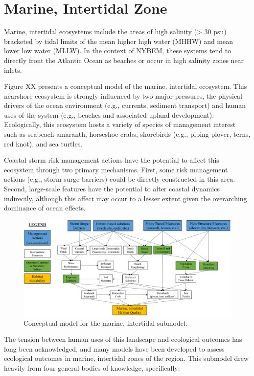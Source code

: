 \documentclass[
]{book}
\begin{document}
\hypertarget{marine-intertidal-zone}{%
\section{Marine, Intertidal Zone}\label{marine-intertidal-zone}}

Marine, intertidal ecosystems include the areas of high salinity (\textgreater{} 30 psu) bracketed by tidal limits of the mean higher high water (MHHW) and mean lower low water (MLLW). In the context of NYBEM, these systems tend to directly front the Atlantic Ocean as beaches or occur in high salinity zones near inlets.

Figure XX presents a conceptual model of the marine, intertidal ecosystem. This nearshore ecosystem is strongly influenced by two major pressures, the physical drivers of the ocean environment (e.g., currents, sediment transport) and human uses of the system (e.g., beaches and associated upland development). Ecologically, this ecosystem hosts a variety of species of management interest such as seabeach amaranth, horseshoe crabs, shorebirds (e.g., piping plover, terns, red knot), and sea turtles.

Coastal storm risk management actions have the potential to affect this ecosystem through two primary mechanisms. First, some risk management actions (e.g., storm surge barriers) could be directly constructed in this area. Second, large-scale features have the potential to alter coastal dynamics indirectly, although this affect may occur to a lesser extent given the overarching dominance of ocean effects.

\begin{figure}
\includegraphics[width=24.99in]{ZZ_Fig04.10_Mar.Int_ConModel} \caption{Conceptual model for the marine, intertidal submodel.}\label{fig:unnamed-chunk-19}
\end{figure}

The tension between human uses of this landscape and ecological outcomes has long been acknowledged, and many models have been developed to assess ecological outcomes in marine, intertidal zones of the region. This submodel drew heavily from four general bodies of knowledge, specifically:
\end{document}
